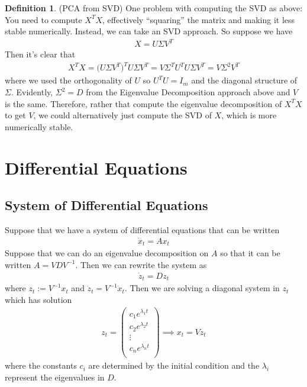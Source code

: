 \documentclass[12pt]{article}
\numberwithin{equation}{section} %
\theoremstyle{plain}
\theoremstyle{definition}
\newtheorem{defn}[thm]{Definition}
\theoremstyle{remark}
\newcommand{\dx}{\dot{x}}
\newcommand{\dz}{\dot{z}}
\begin{document}
\begin{defn}(PCA from SVD)
One problem with computing the SVD as above: You need to compute $X^TX$,
effectively ``squaring'' the matrix and making it less stable
numerically. Instead, we can take an SVD approach. So suppose we have
\begin{align*}
  X = U\Sigma V^T
\end{align*}
Then it's clear that
\begin{align*}
  X^TX
  = \big(U\Sigma V^T\big)^TU\Sigma V^T
  = V\Sigma^T U^TU\Sigma V^T
  = V\Sigma^2 V^T
\end{align*}
where we used the orthogonality of $U$ so $U^TU=I_m$ and the diagonal
structure of $\Sigma$. Evidently, $\Sigma^2=D$ from the Eigenvalue
Decomposition approach above and $V$ is the same. Therefore, rather that
compute the eigenvalue decomposition of $X^TX$ to get $V$, we could
alternatively just compute the SVD of $X$, which is more numerically
stable.
\end{defn}


\clearpage
\section{Differential Equations}

\subsection{System of Differential Equations}

Suppose that we have a system of differential equations that can be
written
\begin{align*}
  \dx_t = Ax_t
\end{align*}
Suppose that we can do an eigenvalue decomposition on $A$ so that it can
be written $A = VD V^{-1}$. Then we can rewrite the system as
\begin{align*}
  \dz_t = Dz_t
\end{align*}
where $z_t:= V^{-1}x_t$ and $\dz_t=V^{-1}\dx_t$. Then we are solving a
diagonal system in $z_t$ which has solution
\begin{align*}
  z_t =
  \begin{pmatrix}
    c_1 e^{\lambda_1 t} \\
    c_2 e^{\lambda_2 t} \\
    \vdots \\
    c_n e^{\lambda_n t} \\
  \end{pmatrix}
  \implies
  x_t = V z_t
\end{align*}
where the constants $c_i$ are determined by the initial condition and
the $\lambda_i$ represent the eigenvalues in $D$.
\end{document}
